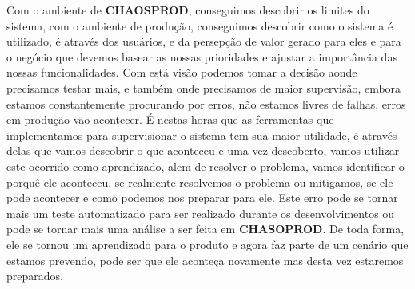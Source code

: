     Com o ambiente de \textbf{CHAOSPROD}, conseguimos descobrir os limites do
    sistema, com o ambiente de produção, conseguimos descobrir como o sistema é
    utilizado, é através dos usuários, e da persepção de valor gerado para eles
    e para o negócio que devemos basear as nossas prioridades e ajustar a
    importância das nossas funcionalidades. Com está visão podemos tomar a decisão
    aonde precisamos testar mais, e também onde precisamos de maior supervisão,
    embora estamos constantemente procurando por erros, não estamos livres de
    falhas, erros em produção vão acontecer. É nestas horas que as ferramentas
    que implementamos para supervisionar o sistema tem sua maior utilidade, é
    através delas que vamos descobrir o que aconteceu e uma vez descoberto, vamos
    utilizar este ocorrido como aprendizado, alem de resolver o problema, vamos
    identificar o porquê ele aconteceu, se realmente resolvemos o problema ou
    mitigamos, se ele pode acontecer e como podemos nos preparar para ele. Este
    erro pode se tornar mais um teste automatizado para ser realizado durante os
    desenvolvimentos ou pode se tornar mais uma análise a ser feita em
    \textbf{CHASOPROD}. De toda forma, ele se tornou um aprendizado para o produto
    e agora faz parte de um cenário que estamos prevendo, pode ser que ele
    aconteça novamente mas desta vez estaremos preparados.

